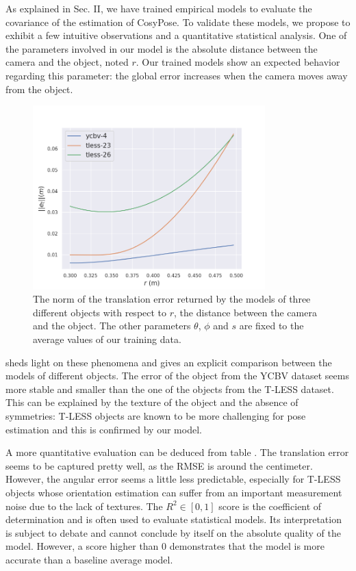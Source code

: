 As explained in Sec. II, we have trained empirical models to evaluate the covariance of the estimation of CosyPose. 
To validate these models, we propose to exhibit a few intuitive observations and a quantitative statistical analysis. 
One of the parameters involved in our model is the absolute distance between the camera and the object, noted $r$. 
Our trained models show an expected behavior regarding this parameter: the global error increases when the camera moves away from the object. 
%
\begin{figure}[h]
  \centering 
  \includegraphics[width=0.8\textwidth]{figures/cosyslam/empirical_err.png}
  \caption{The norm of the translation error returned by the models of three different objects with respect to $r$, the distance between the camera and the object. 
            The other parameters $\theta$, $\phi$ and $s$ are fixed to the average values of our training data. }
  \label{fig:empirical_err}
\end{figure}

 sheds light on these phenomena and gives an explicit comparison between the models of different objects. 
The error of the object from the YCBV dataset seems more stable and smaller than the one of the objects from the T-LESS dataset. 
This can be explained by the texture of the object and the absence of symmetries: T-LESS objects are known to be more challenging 
for pose estimation and this is confirmed by our model.

A more quantitative evaluation can be deduced from table . The translation error seems to be captured pretty well,
 as the RMSE is around the centimeter. However, the angular error seems a little less predictable, especially for T-LESS objects whose orientation 
 estimation can suffer from an important measurement noise due to the lack of textures. The $R^2\in[0,1]$ score is the coefficient of determination 
 and is often used to evaluate statistical models. Its interpretation is subject to debate and cannot conclude by itself on the absolute quality of the model. 
 However, a score higher than 0 demonstrates that the model is more accurate than a baseline average model.

